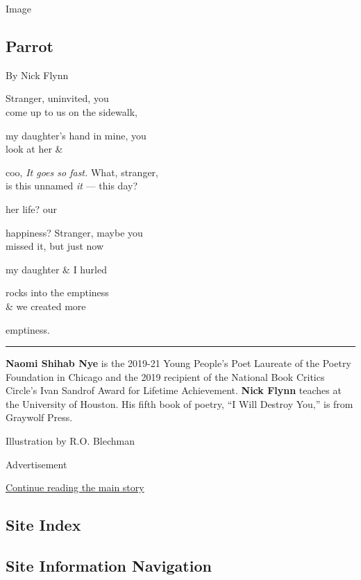 Image

\hypertarget{parrot}{%
\subsection{Parrot}\label{parrot}}

By Nick Flynn

 Stranger, uninvited, you\\
come up to us on the sidewalk,

my daughter's hand in mine, you\\
look at her \&

coo, \emph{It goes so fast.} What, stranger,\\
is this unnamed \emph{it} --- this day?

her life? our

happiness? Stranger, maybe you\\
missed it, but just now

my daughter \& I hurled

rocks into the emptiness\\
\& we created more

emptiness.

\begin{center}\rule{0.5\linewidth}{\linethickness}\end{center}

\textbf{Naomi Shihab Nye} is the 2019-21 Young People's Poet Laureate of
the Poetry Foundation in Chicago and the 2019 recipient of the National
Book Critics Circle's Ivan Sandrof Award for Lifetime Achievement.
\textbf{Nick Flynn} teaches at the University of Houston. His fifth book
of poetry, ``I Will Destroy You,'' is from Graywolf Press.

Illustration by R.O. Blechman

Advertisement

\protect\hyperlink{after-bottom}{Continue reading the main story}

\hypertarget{site-index}{%
\subsection{Site Index}\label{site-index}}

\hypertarget{site-information-navigation}{%
\subsection{Site Information
Navigation}\label{site-information-navigation}}

